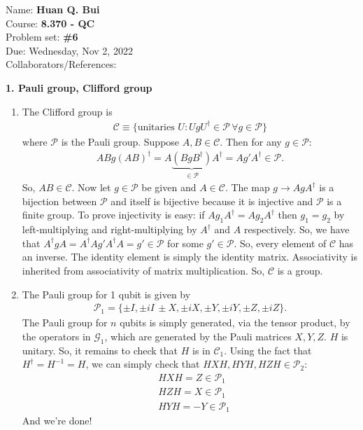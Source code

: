 \documentclass{article}
\theoremstyle{definition}
\begin{document}
\begin{framed}
\noindent Name: \textbf{Huan Q. Bui}\\
Course: \textbf{8.370 - QC}\\
Problem set: \textbf{\#6}\\
Due: Wednesday, Nov 2, 2022\\
Collaborators/References: 
\end{framed}


\noindent \textbf{1. Pauli group, Clifford group} 

\begin{enumerate}[label=(\alph*)]
	\item The Clifford group is 
	\begin{align*}
		\mathcal{C} \equiv \{ \text{unitaries } U : U g U^\dagger \in \mathcal{P}\, \forall g \in \mathcal{P}     \}
	\end{align*}
where $\mathcal{P}$ is the Pauli group. Suppose $A,B\in \mathcal{C}$. Then for any $g\in \mathcal{P}$:
\begin{align*}
	AB g (AB)^\dagger =  A \underbrace{ (BgB^\dagger)}_{\in \mathcal{P}} A^\dagger= A g' A^\dagger \in \mathcal{P}.
\end{align*}
So, $AB\in \mathcal{C}$. Now let $g\in \mathcal{P}$ be given and $A\in \mathcal{C}$. The map $g\to A g A^\dagger$ is a bijection between $\mathcal{P}$ and itself is bijective because it is injective and $\mathcal{P}$ is a finite group. To prove injectivity is easy: if $Ag_1 A^\dagger = A g_2 A^\dagger$ then $g_1 = g_2$ by left-multiplying and right-multiplying by $A^\dagger$ and $A$ respectively. So, we have that $A^\dagger g A = A^\dagger A g' A^\dagger A = g' \in \mathcal{P}$ for some $g' \in \mathcal{P}$. So, every element of $\mathcal{C}$ has an inverse. The identity element is simply the identity matrix. Associativity is inherited from associativity of matrix multiplication. So, $\mathcal{C}$ is a group. 
	
	\item The Pauli group for 1 qubit is given by 
	\begin{align*}
		\mathcal{P}_1 = \{ \pm I, \pm iI\,\pm X, \pm iX, \pm Y, \pm i Y, \pm Z, \pm iZ \}.
	\end{align*}
	The Pauli group for $n$ qubits is simply generated, via the tensor product, by the operators in $\mathcal{G}_1$, which are generated by the Pauli matrices $X,Y,Z$. $H$ is unitary. So, it remains to check that $H$ is in $\mathcal{C}_1$. Using the fact that $H^\dagger = H^{-1} = H$, we can simply check that $HXH, HYH, HZH \in \mathcal{P}_2$:
	\begin{align*}
		&HXH = Z \in \mathcal{P}_1 \\
		&HZH = X \in \mathcal{P}_1 \\
		&HYH = -Y \in \mathcal{P}_1
	\end{align*}
	And we're done!
	

\end{enumerate}
\end{document}
